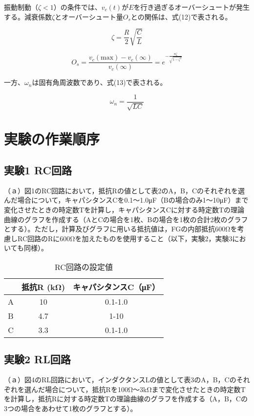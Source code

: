 \documentclass[a4paper,11pt,xelatex,ja=standard]{bxjsarticle}
\begin{document}
    振動制動（$\zeta < 1$）の条件では、$v_c(t)$が$E$を行き過ぎるオーバーシュートが発生する。減衰係数$\zeta$とオーバーシュート量$O_s$との関係は、式(12)で表される。

    \begin{equation}
    \zeta = \frac{R}{2} \sqrt{\frac{C}{L}}
    \end{equation}

    \begin{equation}
    O_s = \frac{v_c(\text{max})-v_c(\infty)}{v_c(\infty)} = e^{-\frac{\pi \zeta}{\sqrt{1-\zeta^2}}}
    \end{equation}

    一方、$\omega_n$は固有角周波数であり、式(13)で表される。

    \begin{equation}
    \omega_n = \frac{1}{\sqrt{LC}}
    \end{equation}


    \section{実験の作業順序}

    \subsection{実験1 RC回路}
    （ａ）図1のRC回路において，抵抗Rの値として表2のA，B，Cのそれぞれを選んだ場合について，キャパシタンスCを0.1～1.0μF（Bの場合のみ1～10μF）まで変化させたときの時定数Tを計算し，キャパシタンスCに対する時定数Tの理論曲線のグラフを作成する（AとCの場合を1枚、Bの場合を1枚の合計2枚のグラフとする）。ただし，計算及びグラフに用いる抵抗値は，FGの内部抵抗600Ωを考慮しRC回路のRに600Ωを加えたものを使用すること（以下，実験2，実験3においても同様）。
    
    \begin{table}[htbp]
    \centering
    \caption{RC回路の設定値}
    \begin{tabular}{|c|c|c|}
    \hline
    & 抵抗R (kΩ) & キャパシタンスC（μF） \\
    \hline
    A & 10 & 0.1-1.0 \\
    B & 4.7 & 1-10 \\
    C & 3.3 & 0.1-1.0 \\
    \hline
    \end{tabular}
    \end{table}
    
    \subsection{実験2 RL回路}
    （ａ）図4のRL回路において，インダクタンスLの値として表3のA，B，Cのそれぞれを選んだ場合について，抵抗Rを100Ω～3kΩまで変化させたときの時定数Tを計算し，抵抗Rに対する時定数Tの理論曲線のグラフを作成する（A，B，Cの3つの場合をあわせて1枚のグラフとする）。
    
\end{document}

